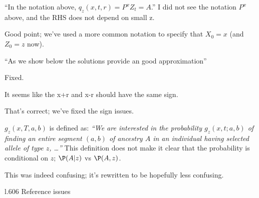 \reply
{}

\begin{point}{\revref}
``In the notation above, $q_z(x, t, r) = P^x{Z_t = A}$.''
I did not see the notation $P^x$ above, and the RHS does not depend on small z.
\end{point}

\reply
Good point; we've used a more common notation to specify that $X_0=x$ (and $Z_0=z$ now).

\begin{point}{} 
``As we show below the solutions provide an good approximation''
\end{point}

\reply
Fixed.

\begin{point}{\revref}
It seems like the x+r and x-r should have the same sign.
\end{point}

\reply
That's correct; we've fixed the sign issues.

\begin{point}{\revref}
$g_z(x, T, a,b)$ is defined as: \textit{``We are interested in the probability $g_z(x, t; a, b)$ of finding an entire segment $(a, b)$ of ancestry $A$ in an individual having selected allele of type $z$, \ldots ''}
This definition does not make it clear that the probability is conditional on $z$; $\P(A|z)$ vs $\P(A,z)$.
\end{point}

\reply
This was indeed confusing; it's rewritten to be hopefully less confusing.

\begin{point}{l.606}
Reference issues
\end{point}

\reply
{}



% 
% 
% 
% 


